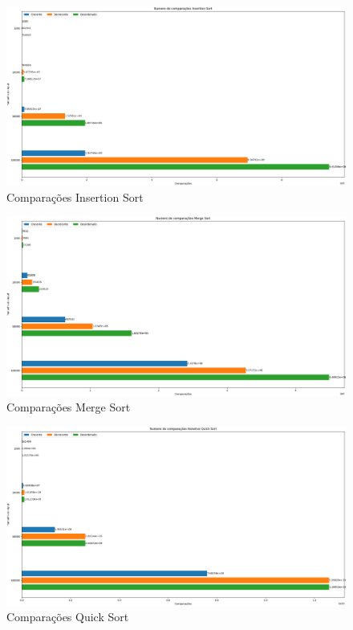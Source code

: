 \documentclass[12pt,a4paper]{article}
\begin{document}
\begin{figure}[H]
    \centering
    \includegraphics[width=\textwidth]{Graficos/Comparações/Insertion Sort.png}
    \caption{Comparações Insertion Sort}
    \label{fig:compInsertionSort}
\end{figure}

\begin{figure}[H]
    \centering
    \includegraphics[width=\textwidth]{Graficos/Comparações/Merge Sort.png}
    \caption{Comparações Merge Sort}
    \label{fig:compMergeSort}
\end{figure}

\begin{figure}[H]
    \centering
    \includegraphics[width=\textwidth]{Graficos/Comparações/Iterative Quick Sort.png}
    \caption{Comparações Quick Sort}
    \label{fig:compQuickSort}
\end{figure}
\end{document}
